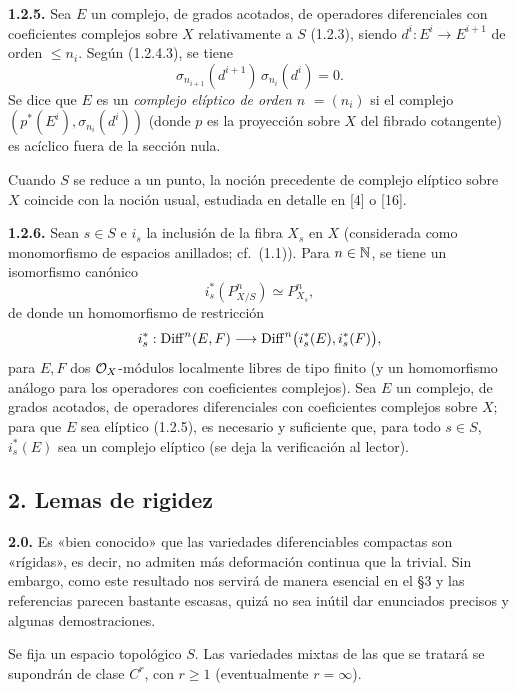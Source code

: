 \providecommand{\sisi}[2]{#2}

\textbf{1.2.5.} Sea $E$ un complejo, de grados acotados, de operadores diferenciales con coeficientes complejos sobre $X$ relativamente a $S$ (1.2.3), siendo $d^i:E^i\longrightarrow E^{i+1}$ de orden $\le n_i$. Según (1.2.4.3), se tiene
\[
 \sigma_{n_{i+1}}(d^{i+1})\,\sigma_{n_i}(d^i)=0.
\]
Se dice que $E$ es un \emph{complejo elíptico de orden $n$} $=(n_i)$ si el complejo $(p^*(E^i),\sigma_{n_i}(d^i))$ (donde $p$ es la proyección sobre $X$ del fibrado cotangente) es acíclico fuera de la sección nula.

Cuando $S$ se reduce a un punto, la noción precedente de complejo elíptico sobre $X$ coincide con la noción usual, estudiada en detalle en [4] o [16].

\textbf{1.2.6.} Sean $s\in S$ e $i_s$ la inclusión de la fibra $X_s$ en $X$ (considerada como monomorfismo de espacios anillados; cf.~(1.1)). Para $n\in\mathbb N$, se tiene un isomorfismo canónico
\[
 i_s^*(P^n_{X/S})\simeq P^n_{X_s},
\]
de donde un homomorfismo de restricción
\[
 i_s^*:\operatorname{Diff}^n(E,F)
 \longrightarrow
 \operatorname{Diff}^n\bigl(i_s^*(E),i_s^*(F)\bigr),
\]
para $E,F$ dos $\mathcal O_X$-módulos localmente libres de tipo finito (y un homomorfismo análogo para los operadores con coeficientes complejos). Sea $E$ un complejo, de grados acotados, de operadores diferenciales con coeficientes complejos sobre $X$; para que $E$ sea elíptico (1.2.5), es necesario y suficiente que, para todo $s\in S$, $i_s^*(E)$ sea un complejo elíptico (se deja la verificación al lector).

\subsection*{2. Lemas de rigidez}

\textbf{2.0.} Es «bien conocido» que las variedades diferenciables compactas son «rígidas», es decir, no admiten más deformación continua que la trivial. Sin embargo, como este resultado nos servirá de manera esencial en el §3 y las referencias parecen bastante escasas, quizá no sea inútil dar enunciados precisos y algunas demostraciones.

Se fija un espacio topológico $S$. Las variedades mixtas de las que se tratará se supondrán de clase $C^r$, con $r\ge1$ (eventualmente $r=\infty$).

